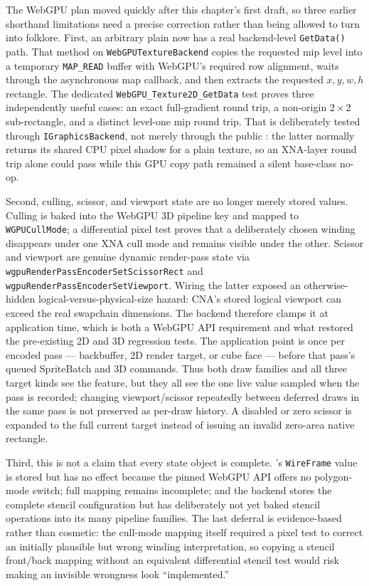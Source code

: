 The WebGPU plan moved quickly after this chapter's first draft, so three earlier shorthand
limitations need a precise correction rather than being allowed to turn into folklore. First,
an arbitrary plain  now has a real backend-level \texttt{GetData()} path.
That method on \texttt{WebGPUTextureBackend} copies the requested mip level into a temporary
\texttt{MAP\_READ} buffer with WebGPU's required row alignment, waits through the asynchronous
map callback, and then extracts the requested $x,y,w,h$ rectangle. The dedicated
\texttt{WebGPU\_Texture2D\_GetData} test proves three independently useful cases: an exact
full-gradient round trip, a non-origin $2\times2$ sub-rectangle, and a distinct level-one mip
round trip. That is deliberately tested through \texttt{IGraphicsBackend}, not merely through
the public : the latter normally returns its shared CPU pixel shadow for a
plain texture, so an XNA-layer round trip alone could pass while this GPU copy path remained a
silent base-class no-op.

Second, culling, scissor, and viewport state are no longer merely stored values. Culling is
baked into the WebGPU 3D pipeline key and mapped to \texttt{WGPUCullMode}; a differential
pixel test proves that a deliberately chosen winding disappears under one XNA cull mode and
remains visible under the other. Scissor and viewport are genuine dynamic render-pass state via
\texttt{wgpuRenderPassEncoderSetScissorRect} and
\texttt{wgpuRenderPassEncoderSetViewport}. Wiring the latter exposed an otherwise-hidden
logical-versus-physical-size hazard: CNA's stored logical viewport can exceed the real
swapchain dimensions. The backend therefore clamps it at application time, which is both a
WebGPU API requirement and what restored the pre-existing 2D and 3D regression tests.
The application point is once per encoded pass --- backbuffer, 2D render target, or cube face
--- before that pass's queued SpriteBatch and 3D commands. Thus both draw families and all
three target kinds see the feature, but they all see the one live value sampled when the pass
is recorded; changing viewport/scissor repeatedly between deferred draws in the same pass is
not preserved as per-draw history. A disabled or zero scissor is expanded to the full current
target instead of issuing an invalid zero-area native rectangle.

Third, this is not a claim that every state object is complete. 's
\texttt{WireFrame} value is stored but has no effect because the pinned WebGPU API offers no
polygon-mode switch; full  mapping remains incomplete; and the backend
stores the complete stencil configuration but has deliberately not yet baked stencil operations
into its many pipeline families. The last deferral is evidence-based rather than cosmetic:
the cull-mode mapping itself required a pixel test to correct an initially plausible but wrong
winding interpretation, so copying a stencil front/back mapping without an equivalent
differential stencil test would risk making an invisible wrongness look ``implemented.''

